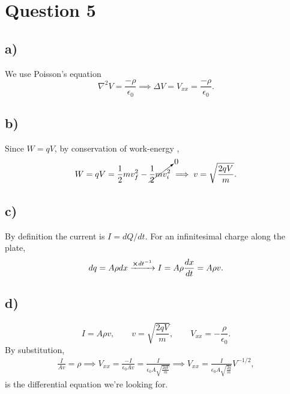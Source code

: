 \documentclass[
	12pt,
	]{article}
\newcommand{\ep}{\epsilon}
\theoremstyle{definition}
\theoremstyle{definition}
\theoremstyle{definition}
\theoremstyle{definition}
\theoremstyle{definition}
\theoremstyle{example}
\theoremstyle{note}
\theoremstyle{remark}
\theoremstyle{example}
\begin{document}
		 \section*{Question 5}
		 	\subsection*{a) }
		 		We use Poisson's equation 
		 		$$ \nabla^{2}V = \frac{-\rho}{\ep_{0}} \implies  \Delta V = V_{xx} =\frac{-\rho}{\ep_{0}}.$$
		 	\subsection*{b) }
		 		Since $W = qV$, by conservation of work-energy , 
		 		$$ W = qV = \frac{1}{2}mv_{f}^{2} - \cancelto{0}{\frac{1}{2} mv_{i}^{2}} \implies v = \sqrt{\frac{2qV}{m}}.$$
		 	\subsection*{c) }
		 		By definition the current is $I = dQ/dt$. For an infinitesimal charge along the plate, 
		 		\begin{align*}
		 			dq = A \rho dx \xrightarrow{\cross dt^{-1}} I = A\rho \frac{dx}{dt} = A\rho v.
		 		\end{align*}
		 	\subsection*{d) }
		 		$$ I = A \rho v, \qquad v =  \sqrt{\frac{2qV}{m}} , \qquad V_{xx} = -\frac{\rho}{\ep_{0}}.$$
		 		By substitution, 
		 		\begin{align*}
		 			\frac{I}{Av} = \rho \implies V_{xx} = \frac{-I}{\ep_{0}Av} = \frac{I}{\ep_{0}A\sqrt{\frac{2qV}{m}}} \implies V_{xx} = \frac{I}{\ep_{0}A \sqrt{\frac{2q}{m}}} V^{-1/2},
		 		\end{align*}
		 		is the differential equation we're looking for.
\end{document}
